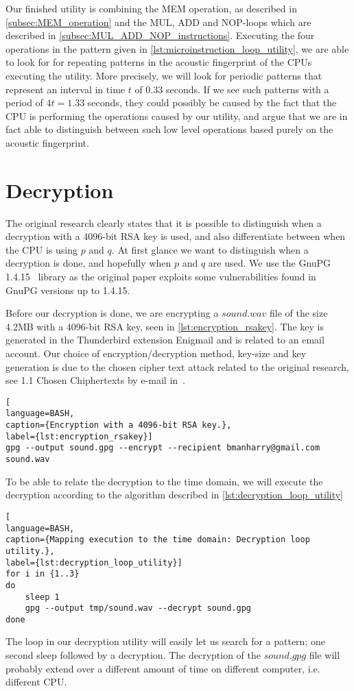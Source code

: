 Our finished utility is combining the MEM operation, as described in \autoref{subsec:MEM_operation} and the MUL, ADD and NOP-loops which are described in \autoref{subsec:MUL_ADD_NOP_instructions}.
Executing the four operations in the pattern given in \autoref{lst:microinstruction_loop_utility}, we are able to look for for repeating patterns in the acoustic fingerprint of the CPUs executing the utility.
More precisely, we will look for periodic patterns that represent an interval in time \(t\) of \(0.33\) seconds. 
If we see such patterns with a period of \(4t = 1.33\) seconds, they could possibly be caused by the fact that the CPU is performing the operations caused by our utility, and argue that we are in fact able to distinguish between such low level operations based purely on the acoustic fingerprint. 



\section{Decryption}\label{chp4:decryption}

The original research clearly states that it is possible to distinguish when a decryption with a 4096-bit RSA key is used, and also differentiate between when the CPU is using \(p\) and \(q\).
At first glance we want to distinguish when a decryption is done, and hopefully when \(p\) and \(q\) are used. 
We use the GnuPG 1.4.15~\cite{url:GnuPG_1.4.15} library as the original paper exploits some vulnerabilities found in GnuPG versions up to 1.4.15. 

Before our decryption is done, we are encrypting a \(sound.wav\) file of the size 4.2MB with a 4096-bit RSA key, seen in \autoref{lst:encryption_rsakey}. The key is generated in the Thunderbird extension Enigmail and is related to an email account.
Our choice of encryption/decryption method, key-size and key generation is due to the chosen cipher text attack related to the original research, see 1.1 Chosen Chiphertexts by e-mail in~\cite{DBLP:conf/crypto/GenkinST14}. 
\begin{lstlisting}[
language=BASH, 
caption={Encryption with a 4096-bit RSA key.}, 
label={lst:encryption_rsakey}]
gpg --output sound.gpg --encrypt --recipient bmanharry@gmail.com sound.wav
\end{lstlisting}

To be able to relate the decryption to the time domain, we will execute the decryption according to the algorithm described in \autoref{lst:decryption_loop_utility}

\begin{lstlisting}[
language=BASH, 
caption={Mapping execution to the time domain: Decryption loop utility.}, 
label={lst:decryption_loop_utility}]
for i in {1..3}
do
    sleep 1
    gpg --output tmp/sound.wav --decrypt sound.gpg
done
\end{lstlisting}

The loop in our decryption utility will easily let us search for a pattern; one second sleep followed by a decryption. 
The decryption of the \(sound.gpg\) file will probably extend over a different amount of time on different computer, i.e. different CPU. 
